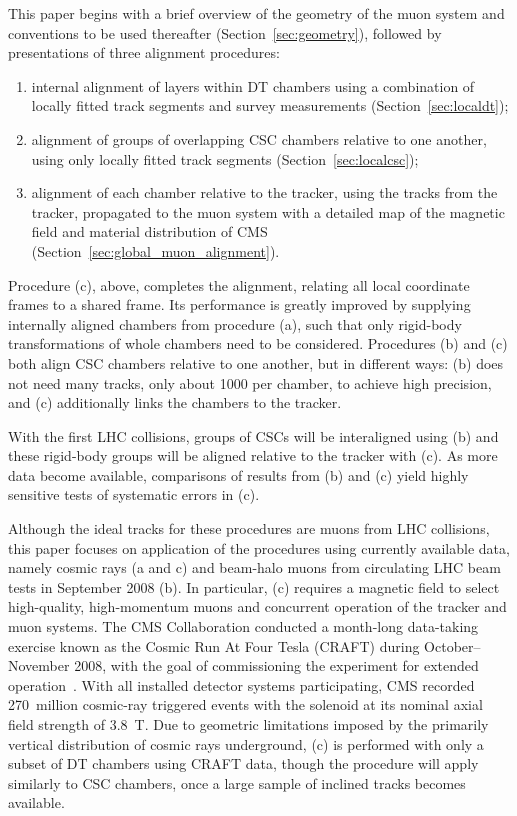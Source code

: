 \documentclass[11pt,twoside,a4paper,cmspaper]{cms-tdr}
\begin{document}
This paper begins with a brief overview of the geometry of the muon
system and conventions to be used thereafter
(Section~\ref{sec:geometry}), followed by presentations of three
alignment procedures:
{\renewcommand{\labelenumi}{(\alph{enumi})}
\begin{enumerate}
\item internal alignment of layers within DT chambers using a
combination of locally fitted track segments and survey measurements
(Section~\ref{sec:localdt});
\item alignment of groups of overlapping CSC chambers relative to one
another, using only locally fitted track segments
(Section~\ref{sec:localcsc});
\item alignment of each chamber relative to the tracker, using
the tracks from the tracker, propagated to the muon system with a
detailed map of the magnetic field and material distribution of CMS
(Section~\ref{sec:global_muon_alignment}).
\end{enumerate}}

Procedure (c), above, completes the alignment, relating all
local coordinate frames to a shared frame.  Its performance is greatly
improved by supplying internally aligned chambers from procedure (a),
such that only rigid-body transformations of whole chambers need to be
considered.  Procedures (b) and (c) both align CSC chambers relative
to one another, but in different ways: (b) does not need many tracks,
only about 1000 per chamber, to achieve high precision, and
(c) additionally links the chambers to the tracker.

With the first LHC collisions, groups of CSCs will be interaligned
using (b) and these rigid-body groups will be aligned relative to the
tracker with (c).  As more data become available, comparisons of
results from (b) and (c) yield highly sensitive tests of systematic
errors in (c).

Although the ideal tracks for these procedures are muons from LHC
collisions, this paper focuses on application of the procedures using
currently available data, namely cosmic rays (a and c) and beam-halo
muons from circulating LHC beam tests in September 2008 (b).  In
particular, (c) requires a magnetic field to select high-quality,
high-momentum muons and concurrent operation of the tracker and muon
systems.  The CMS Collaboration conducted a month-long data-taking
exercise known as the Cosmic Run At Four Tesla (CRAFT) during
October--November 2008, with the goal of commissioning the experiment
for extended operation~\cite{ref:CRAFTGeneral}.  With all installed
detector systems participating, CMS recorded 270~million cosmic-ray
triggered events with the solenoid at its nominal axial field strength
of 3.8~T.  Due to geometric limitations imposed by the primarily
vertical distribution of cosmic rays underground, (c) is performed with
only a subset of DT chambers using CRAFT data, though the procedure
will apply similarly to CSC chambers, once a large sample of
inclined tracks becomes available.
\end{document}
